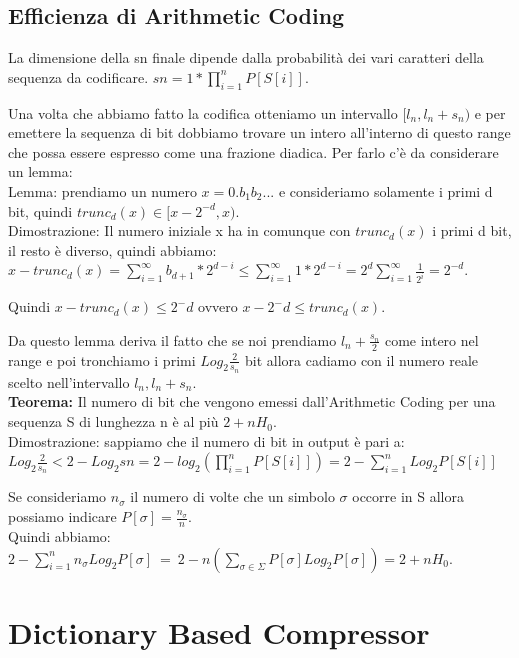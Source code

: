 \documentclass[14pt]{extreport}
\begin{document}
\section{Efficienza di Arithmetic Coding}

La dimensione della sn finale dipende dalla probabilità dei vari caratteri della sequenza da codificare.
$sn=1*\prod^n_{i=1} P[S[i]]$.

Una volta che abbiamo fatto la codifica otteniamo un intervallo $[l_n,l_n+s_n)$ e per emettere la sequenza di bit dobbiamo trovare un intero all'interno di questo range che possa essere espresso come una frazione diadica.
Per farlo c'è da considerare un lemma:\\

Lemma: prendiamo un numero $x=0.b_1b_2...$ e consideriamo solamente i primi d bit, quindi $trunc_d(x) \in [x-2^{-d},x)$. \\
Dimostrazione: Il numero iniziale x ha in comunque con $trunc_d(x)$ i primi d bit, il resto è diverso, quindi abbiamo:\\
$x-trunc_d(x) = \sum^\infty_{i=1} b_{d+1}*2^{d-i} \leq \sum^\infty_{i=1} 1*2^{d-i} = 2^d \sum^\infty_{i=1} \frac{1}{2^i}= 2^{-d}$.

Quindi $x-trunc_d(x) \leq 2^-d$ ovvero $x-2^-d \leq trunc_d(x)$.

Da questo lemma deriva il fatto che se noi prendiamo $l_n+\frac{s_n}{2}$ come intero nel range e poi tronchiamo i primi $Log_2 \frac{2}{s_n}$ bit allora cadiamo con il numero reale scelto nell'intervallo $l_n, l_n+s_n$.\\

\textbf{Teorema:} Il numero di bit che vengono emessi dall'Arithmetic Coding per una sequenza S di lunghezza n è al più $2+nH_0$. \\
Dimostrazione: sappiamo che il numero di bit in output è pari a: \\

$Log_2 \frac{2}{s_n} < 2 - Log_2 sn = 2 - log_2(\prod^n_{i=1}P[S[i]]) = 2-\sum^n_{i=1}Log_2 P[S[i]]$

Se consideriamo $n_\sigma$ il numero di volte che un simbolo $\sigma$ occorre in S allora possiamo indicare $P[\sigma] = \frac{n_\sigma}{n}$.\\
Quindi abbiamo:
$2-\sum^n_{i=1}n_\sigma Log_2 P[\sigma]\ =\ 2-n(\sum_{\sigma \in \Sigma}P[\sigma]Log_2P[\sigma]) = 2+nH_0$. 


\chapter{Dictionary Based Compressor}
\end{document}
